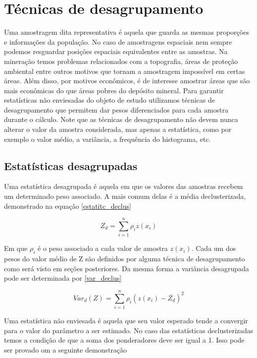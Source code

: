 \chapter{Técnicas de desagrupamento} \label{Cap_4}



Uma amostragem dita representativa é aquela que guarda as mesmas proporções e informações da população. No caso de amostragens espaciais nem sempre podemos resguardar posições espaciais equivalentes entre as amostras. Na mineração temos problemas relacionados com a topografia, áreas de proteção ambiental entre outros motivos que tornam a amostragem impossível em certas áreas. Além disso, por motivos econômicos, é de interesse amostrar áreas que são mais econômicas do que áreas pobres do depósito mineral. Para garantir estatísticas não enviesadas do objeto de estudo utilizamos técnicas de desagrupamento que permitem dar pesos diferenciados para cada amostra durante o cálculo. Note que as técnicas de desagrupamento não devem nunca alterar o valor da amostra considerada, mas apenas a estatística, como por exemplo o valor médio, a variância, a frequência do histograma, etc.

\section{Estatísticas desagrupadas} \label{demons_krig} 

Uma estatística desagrupada é aquela em que os valores das amostras recebem um determinado peso associado. A mais comum delas é a média declusterizada, demonstrado na equação \eqref{estatitc_declus}

\begin{equation}\label{estatitc_declus}
	\overline{Z_{d}} = \sum_{i=1}^{n} \rho _{i}z(x_{i})
\end{equation}

Em que $\rho _{i}$ é o peso associado a cada valor de amostra $z(x_{i})$. Cada um dos pesos do valor médio de Z são definidos por alguma técnica de desagrupamento como será visto em seções posteriores. Da mesma forma a variância desagrupada pode ser determinada por \eqref{var_declus}
 
 \begin{equation}\label{var_declus}
 Var_{d}(Z) = \sum_{i=1}^{n} \rho _{i} \left( z(x_{i}) - \overline{Z_{d}} \right)^2
 \end{equation}
 
 Uma estatística não enviesada é aquela que seu valor esperado tende a convergir para o valor do parâmetro a ser estimado. No caso das estatísticas declusterizadas temos a condição de que a soma dos ponderadores deve ser igual a 1. Isso pode ser provado om a seguinte demonstração
 
